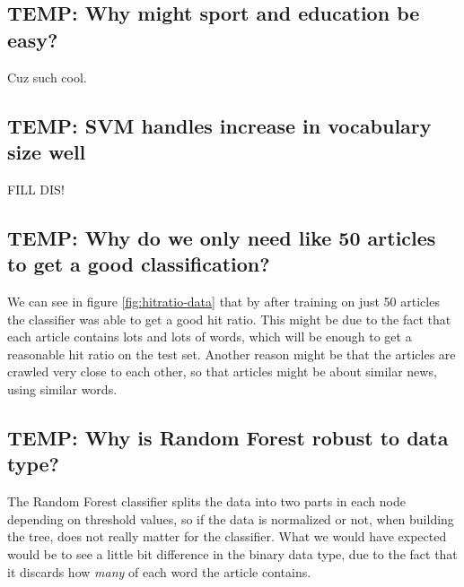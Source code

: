 \subsection{TEMP: Why might sport and education be easy?} %
\label{sub:temp_why_might_sport_and_education_be_easy_}
Cuz such cool.

\subsection{TEMP: SVM handles increase in vocabulary size well} %
\label{sub:temp_svm_handles_increase_in_vocabulary_size_well}
FILL DIS!

\subsection{TEMP: Why do we only need like 50 articles to get a good classification?} %
\label{sub:temp_why_do_we_only_need_like_50_articles_to_get_a_good_classification_}
We can see in figure \ref{fig:hitratio-data} that by after training on just 50 articles the classifier was able to get a good hit ratio. This might be due to the fact that each article contains lots and lots of words, which will be enough to get a reasonable hit ratio on the test set. Another reason might be that the articles are crawled very close to each other, so that articles might be about similar news, using similar words.

\subsection{TEMP: Why is Random Forest robust to data type?} %
\label{sub:temp_why_is_random_forest_robust_to_data_type_}
The Random Forest classifier splits the data into two parts in each node depending on threshold values, so if the data is normalized or not, when building the tree, does not really matter for the classifier. What we would have expected would be to see a little bit difference in the binary data type, due to the fact that it discards how \emph{many} of each word the article contains.

